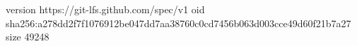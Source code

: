 version https://git-lfs.github.com/spec/v1
oid sha256:a278dd2f7f1076912be047dd7aa38760c0cd7456b063d003cce49d60f21b7a27
size 49248
